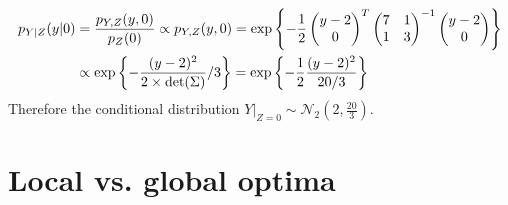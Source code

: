\documentclass[a4paper, 10pt]{article}
\begin{document}
\begin{enumerate}[label=(\alph*)]
\begin{equation}
\begin{aligned}
        p_{Y|Z}(y|0) &= \frac{p_{Y,Z}(y,0)}{p_Z(0)} \propto p_{Y,Z}(y,0) = \exp\left\{-\frac{1}{2}\begin{pmatrix}y-2 \\ 0 \end{pmatrix}^T  \begin{pmatrix} 7 & 1 \\ 1 & 3 \end{pmatrix}^{-1} \begin{pmatrix}y-2 \\ 0 \end{pmatrix}\right\} \\ 
        &\propto \exp\left\{-\frac{(y-2)^2}{2\times {\rm det}(\Sigma)}/3\right\} = \exp\left\{-\frac{1}{2} \frac{(y-2)^2}{20/3}\right\}
    \end{aligned}
\end{equation}
Therefore the conditional distribution $Y |_{Z=0} \sim \mathcal{N}_2\left(2, \frac{20}{3}\right)$.

\end{enumerate}


\section{Local vs. global optima}
\end{document}
